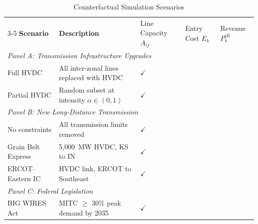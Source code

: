 \documentclass[12pt]{article}
\begin{document}

\begin{landscape}
    \begin{table}[htbp]
        \centering
        \caption{Counterfactual Simulation Scenarios}
        \label{tab:counterfactualRuns}
        \small 
        \begin{tabular}{@{} l p{5cm} >{\centering\arraybackslash}p{2.5cm} >{\centering\arraybackslash}p{2.5cm} >{\centering\arraybackslash}p{2.5cm} @{}}
            \toprule
            & & \multicolumn{3}{c}{\textit{Modified Primitives}} \\
            \cmidrule(lr){3-5}
            \textbf{Scenario} & \textbf{Description} & Line Capacity \newline $A_{ij}$ & Entry Cost \newline $E_k$ & Revenue \newline $P_k^{\text{eff}}$ \\
            \midrule
            
            \multicolumn{5}{l}{\textit{Panel A: Transmission Infrastructure Upgrades}} \\[0.5ex]
            Full HVDC & All inter-zonal lines replaced with HVDC & $\checkmark$ & & \\
            Partial HVDC & Random subset at intensity $\alpha \in (0,1)$ & $\checkmark$ & & \\[1.5ex]
            
            \multicolumn{5}{l}{\textit{Panel B: New Long-Distance Transmission}} \\[0.5ex]
            No constraints & All transmission limits removed & $\checkmark$ & & \\
            Grain Belt Express & 5,000~MW HVDC, KS to IN & $\checkmark$ & & \\
            ERCOT--Eastern IC & HVDC link, ERCOT to Southeast & $\checkmark$ & & \\[1.5ex]
            
            \multicolumn{5}{l}{\textit{Panel C: Federal Legislation}} \\[0.5ex]
            BIG WIRES Act & MITC $\geq$ 30\% peak demand by 2035 & $\checkmark$ & & \\[1.5ex]
            

\end{tabular}
\end{table}
\end{landscape}
\end{document}

